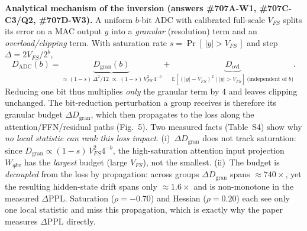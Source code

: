 \documentclass[10pt]{article}
\begin{document}
\vspace{1em}
\noindent\textbf{Analytical mechanism of the inversion (answers \#707A-W1, \#707C-C3/Q2, \#707D-W3).}
A uniform $b$-bit ADC with calibrated full-scale $V_{FS}$ splits its error on a MAC
output $y$ into a \emph{granular} (resolution) term and an \emph{overload/clipping}
term. With saturation rate $s=\Pr[\,|y|>V_{FS}\,]$ and step $\Delta=2V_{FS}/2^{b}$,
\begin{equation*}
D_{\mathrm{ADC}}(b)=\underbrace{D_{\mathrm{gran}}(b)}_{\approx (1-s)\,\Delta^{2}/12\;\propto\;(1-s)\,V_{FS}^{2}\,4^{-b}}+\underbrace{D_{\mathrm{ovl}}}_{\mathbb{E}[(|y|-V_{FS})^{2}\mid |y|>V_{FS}]\;\text{(independent of }b)}.
\end{equation*}
Reducing one bit thus multiplies \emph{only} the granular term by $4$ and leaves
clipping unchanged. The bit-reduction perturbation a group receives is therefore its
granular budget $\Delta D_{\mathrm{gran}}$, which then propagates to the loss along
the attention/FFN/residual paths (Fig.~5). Two measured facts (Table~S4) show why
\emph{no local statistic can rank this loss impact}. (i)~$\Delta D_{\mathrm{gran}}$
does not track saturation: since $D_{\mathrm{gran}}\!\propto\!(1{-}s)\,V_{FS}^{2}4^{-b}$,
the high-saturation attention input projection $W_{qkv}$ has the \emph{largest}
budget (large $V_{FS}$), not the smallest. (ii)~The budget is \emph{decoupled} from
the loss by propagation: across groups $\Delta D_{\mathrm{gran}}$ spans
$\approx\!740\times$, yet the resulting hidden-state drift spans only
$\approx\!1.6\times$ and is non-monotone in the measured $\Delta$PPL. Saturation
($\rho{=}{-}0.70$) and Hessian ($\rho{=}0.20$) each see only one local statistic and
miss this propagation, which is exactly why the paper measures $\Delta$PPL directly.
\end{document}

